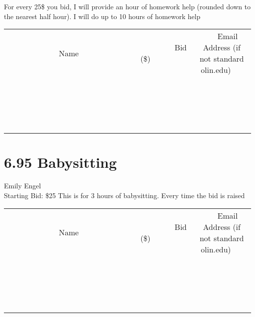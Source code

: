 \documentclass[11pt]{article}
\begin{document}
For every 25\$ you bid, I will provide an hour of homework help (rounded down to the nearest half hour). I will do up to 10 hours of homework help
\\[3ex]
\begin{tabular}{c c c}
~~~~~~~~~~~~~Name~~~~~~~~~~~~~ & ~~~~~~~~~Bid (\$)~~~~~~~~~  & ~~~Email Address (if not standard olin.edu)~~~\\
 & & \\
\hline
 & & \\
\hline
 & & \\
\hline
 & & \\
\hline
 & & \\
\hline
 & & \\
\hline
 & & \\
\hline
 & & \\
\hline
 & & \\
\hline
 & & \\
\hline
 & & \\
\hline
 & & \\
\hline
 & & \\
\hline
 & & \\
\hline
 & & \\
\hline
 & & \\
\hline
 & & \\
\hline
 & & \\
\hline
 & & \\
\hline
\end{tabular}
\newpage
\section*{6.95 Babysitting}
Emily Engel
\\
Starting Bid: \$25
\newline
This is for 3 hours of babysitting.  Every time the bid is raised %
\\[3ex]
\begin{tabular}{c c c}
~~~~~~~~~~~~~Name~~~~~~~~~~~~~ & ~~~~~~~~~Bid (\$)~~~~~~~~~  & ~~~Email Address (if not standard olin.edu)~~~\\
 & & \\
\hline
 & & \\
\hline
 & & \\
\hline
 & & \\
\hline
 & & \\
\hline
 & & \\
\hline
 & & \\
\hline
 & & \\
\hline
 & & \\
\hline
 & & \\
\hline
 & & \\
\hline
 & & \\
\hline
 & & \\
\hline
 & & \\
\hline
 & & \\
\hline
 & & \\
\hline
 & & \\
\hline
 & & \\
\hline
 & & \\
\hline
\end{tabular}
\newpage
\end{document}
